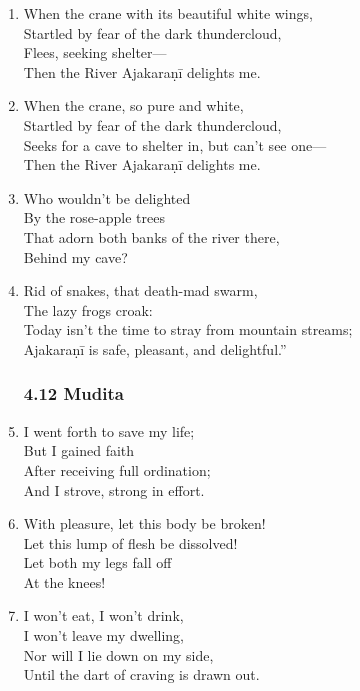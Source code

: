 \documentclass[10pt, openany]{book}
\newcommand*{\vleftofline}[1]{\leavevmode\llap{#1}}
\begin{document}
\begin{enumerate}
\item When the crane with its beautiful white wings,\\
Startled by fear of the dark thundercloud,\\
Flees, seeking shelter—\\
Then the River Ajakaraṇī delights me.

\item When the crane, so pure and white,\\
Startled by fear of the dark thundercloud,\\
Seeks for a cave to shelter in, but can’t see one—\\
Then the River Ajakaraṇī delights me.

\item Who wouldn’t be delighted\\
By the rose-apple trees\\
That adorn both banks of the river there,\\
Behind my cave?

\item Rid of snakes, that death-mad swarm,\\
 The lazy frogs croak:\\
\vleftofline{“}Today isn’t the time to stray from mountain streams;\\
Ajakaraṇī is safe, pleasant, and delightful.”

\subsubsection*{4.12 Mudita}

\item I went forth to save my life;\\
But I gained faith\\
After receiving full ordination;\\
And I strove, strong in effort.

\item With pleasure, let this body be broken!\\
Let this lump of flesh be dissolved!\\
Let both my legs fall off\\
At the knees!

\item I won’t eat, I won’t drink,\\
I won’t leave my dwelling,\\
Nor will I lie down on my side,\\
Until the dart of craving is drawn out.


\end{enumerate}
\end{document}
